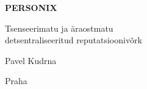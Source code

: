 \thispagestyle{empty}
\begin{center}
  {\sffamily\bfseries\fontsize{34}{40}\selectfont PERSONIX\par}
  \vspace{2.2em}
  {\rmfamily\large Tsenseerimatu ja äraostmatu\\[0.25em]
   detsentraliseeritud reputatsioonivõrk\par}
\end{center}
\begin{center}
  {\rmfamily\Large Pavel Kudrna\par}
  \vspace{0.45em}
  {\rmfamily\small Praha\quad\textbullet{}\par}
\end{center}
\clearpage
